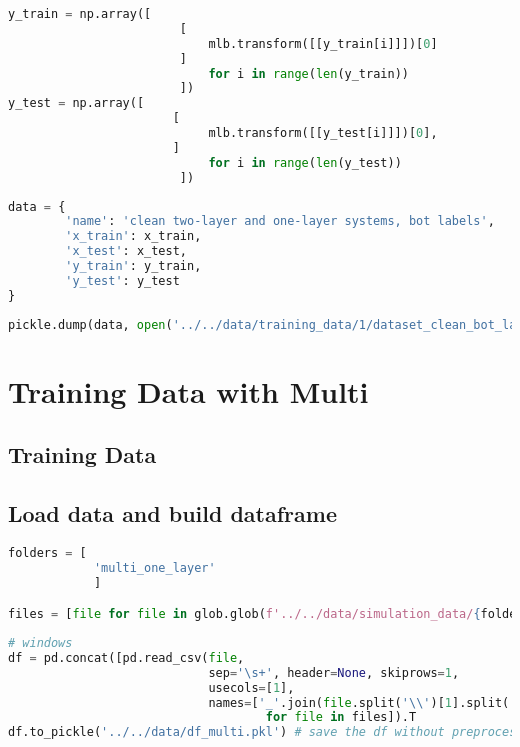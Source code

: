 \begin{lstlisting}[language=Python]
y_train = np.array([    
                        [
                            mlb.transform([[y_train[i]]])[0]
                        ] 
                            for i in range(len(y_train))
                        ])
y_test = np.array([ 
                       [
                            mlb.transform([[y_test[i]]])[0],
                       ] 
                            for i in range(len(y_test))
                        ])
\end{lstlisting}

\begin{lstlisting}[language=Python]
data = {
        'name': 'clean two-layer and one-layer systems, bot labels',
        'x_train': x_train,
        'x_test': x_test,
        'y_train': y_train,
        'y_test': y_test
}
\end{lstlisting}

\begin{lstlisting}[language=Python]
pickle.dump(data, open('../../data/training_data/1/dataset_clean_bot_layer.pkl', 'wb'))
\end{lstlisting}

\hypertarget{training-data-with-multi}{%
\section*{Training Data with Multi}\label{training-data-with-multi}}

\hypertarget{training-data}{%
\subsection*{Training Data}\label{training-data}}

\hypertarget{load-data-and-build-dataframe}{%
\subsection*{Load data and build
dataframe}\label{load-data-and-build-dataframe}}

\begin{lstlisting}[language=Python]
folders = [
            'multi_one_layer'
            ]

files = [file for file in glob.glob(f'../../data/simulation_data/{folders[0]}/*.spc')]
\end{lstlisting}

\begin{lstlisting}[language=Python]
# windows
df = pd.concat([pd.read_csv(file,
                            sep='\s+', header=None, skiprows=1,
                            usecols=[1],
                            names=['_'.join(file.split('\\')[1].split('_')[:-1])]).T 
                                    for file in files]).T
df.to_pickle('../../data/df_multi.pkl') # save the df without preprocessing
\end{lstlisting}

